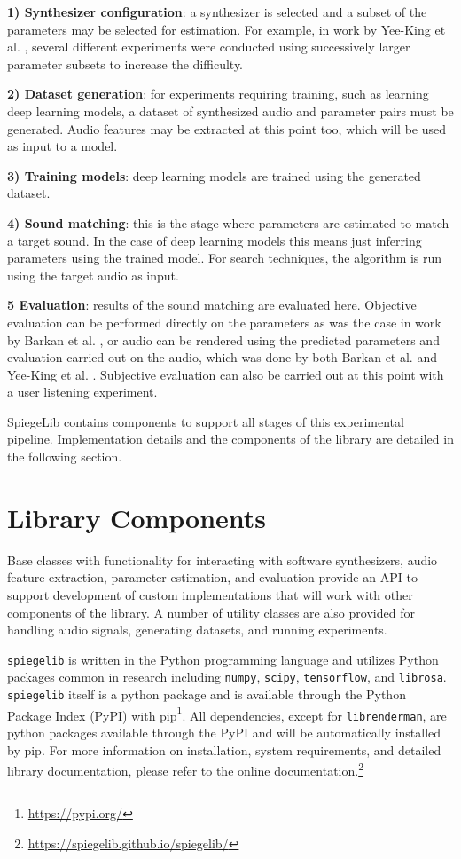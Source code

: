 \textbf{1) Synthesizer configuration}: a synthesizer is selected and a subset of the parameters may be selected for estimation. For example, in work by Yee-King et al. \cite{yee2018automatic}, several different experiments were conducted using successively larger parameter subsets to increase the difficulty.

\textbf{2) Dataset generation}: for experiments requiring training, such as learning deep learning models, a dataset of synthesized audio and parameter pairs must be generated. Audio features may be extracted at this point too, which will be used as input to a model.

\textbf{3) Training models}: deep learning models are trained using the generated dataset.

\textbf{4) Sound matching}: this is the stage where parameters are estimated to match a target sound. In the case of deep learning models this means just inferring parameters using the trained model. For search techniques, the algorithm is run using the target audio as input.

\textbf{5 Evaluation}: results of the sound matching are evaluated here. Objective evaluation can be performed directly on the parameters as was the case in work by Barkan et al. \cite{barkan2019inversynth},  or audio can be rendered using the predicted parameters and evaluation carried out on the audio, which was done by both Barkan et al. and Yee-King et al. \cite{yee2018automatic}. Subjective evaluation can also be carried out at this point with a user listening experiment.

SpiegeLib contains components to support all stages of this experimental pipeline. Implementation details and the components of the library are detailed in the following section.


\section{Library Components}

Base classes with functionality for interacting with software synthesizers, audio feature extraction, parameter estimation, and evaluation provide an API to support development of custom implementations that will work with other components of the library. A number of utility classes are also provided for handling audio signals, generating datasets, and running experiments.

 \texttt{spiegelib} is written in the Python programming language and utilizes Python packages common in research including \texttt{numpy}, \texttt{scipy}, \texttt{tensorflow}, and \texttt{librosa}. \texttt{spiegelib} itself is a python package and is available through the Python Package Index (PyPI) with pip\footnote{\url{https://pypi.org/}}. All dependencies, except for \texttt{librenderman}, are python packages available through the PyPI and will be automatically installed by pip. For more information on installation, system requirements, and detailed library documentation, please refer to the  online documentation.\footnote{\url{https://spiegelib.github.io/spiegelib/}}
 
